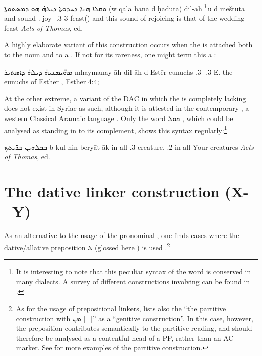 {{{{
{ܘܩܠܐ ܗܢܐ ܕܚܕܘܬܐ ܕܝܠܗ̇ ܗܘ ܕܡܤܬܘܬܐ}
{(w\cb{} qālā hānā d\cb{} ḥadutā) \zero{} dil-āh \cb{}\textsuperscript{h}u d\cb{} meštutā}
{and\cb{} sound \dem.\masc{} \lnk\cb{} joy \zero{} \lnk-\poss.3\fem{} \cb{}3\masc{} \lnk\cb{} feast(\fem)}
{and this sound of rejoicing is that of the wedding-feast}
{\textit{Acts of Thomas}, ed.\ \cite[]{WrightActs}}

A highly elaborate variant  of this construction occurs when the  is attached both to the \prim noun and to a \lnk*. If not for its rareness, one might term this a :

{ܡܗ̈ܝܡܢܝܗ̇ ܕܝܠܗ̇ ܕܐܣܬܝܪ}
{mhaymanay-āh dil-āh d\cb{} Estēr}
	{eunuchs-\poss.3\fem{} \lnk-\poss.3\fem{} \lnk\cb{} E.}
{the eunuchs of Esther}
{\Pesh, Esther 4:4; \cite[8]{WilliamsKings}}

	
At the other extreme, a variant of the DAC in which the \lnk*
 is completely lacking does not exist in Syriac as such, although it is attested in the contemporary , a western Classical Aramaic language \citep[25]{HopkinsName}. Only the word \textsyriac{ܟܘܠ} , which could be analysed as standing in  to its complement, shows this syntax regularly:\footnote{It is interesting to note that this peculiar syntax of the word  is conserved in many  dialects. A survey of  different \Syr constructions involving  can be found in \citet[Ch.\ 3]{WilliamsKings}.  }

{ܒܟܠܗܝܢ ܒܪ̈ܝܬܟ}
{b\cb{} kul-hin beryāt-āk}
{in\cb{} all-\poss.3\fpl{} creature.\fpl-\poss.2\masc}
{in all Your creatures}
{\textit{Acts of Thomas}, ed.\ \cite[]{WrightActs}}\antipar

\section{The dative linker construction (X- \dat\ Y)} \label{ss:dat_lnk}

As an alternative to the usage of the \d pronominal \lnk*, one finds cases where the dative/allative preposition \textsyriac{ܠ}   (glossed here \dat) is used \citep[\S 362]{DuvalSyriaque}.\footnote{As for the usage of prepositional linkers, \citet[8]{WilliamsKings} lists also the \enquote{the partitive construction with \textsyriac{ܡܢ} [=]} as a \enquote{genitive construction}. In this case, however,  the preposition contributes semantically to the partitive reading, and should therefore be analysed as a contentful head of a PP, rather than an AC marker. See \citet[56]{JoostenMatthew} for more examples of the partitive construction.}

}}}}
